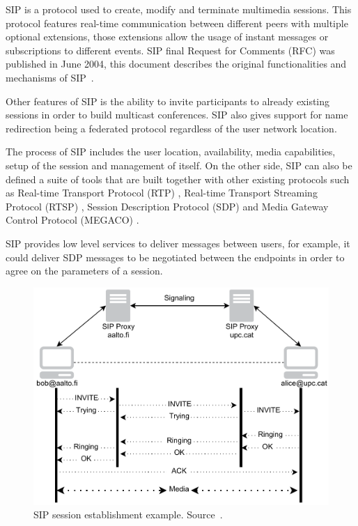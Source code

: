 SIP  is a protocol used to create, modify and terminate multimedia sessions. This protocol features real-time communication between different peers with multiple optional extensions, those extensions allow the usage of instant messages or subscriptions to different events. SIP final Request for Comments (RFC)  was published in June 2004, this document describes the original functionalities and mechanisms of SIP~\cite{sipRFC}.

Other features of SIP is the ability to invite participants to already existing sessions in order to build multicast conferences. SIP also gives support for name redirection being a federated protocol regardless of the user network location.

The process of SIP includes the user location, availability, media capabilities, setup of the session and management of itself. On the other side, SIP can also be defined a suite of tools that are built together with other existing protocols such as Real-time Transport Protocol (RTP) , Real-time Transport Streaming Protocol (RTSP) , Session Description Protocol (SDP)  and Media Gateway Control Protocol (MEGACO) .

SIP provides low level services to deliver messages between users, for example, it could deliver SDP messages to be negotiated between the endpoints in order to agree on the parameters of a session.

\begin{figure}[h]
  \centering
    \includegraphics[width=1\textwidth]{./figures/SIParchitecture.pdf}
      \caption[SIP session establishment example. Source~\cite{sipRFC}.]{SIP session establishment example. Source~\cite{sipRFC}.}
	\label{fig:SIParchitecture}
\end{figure}

